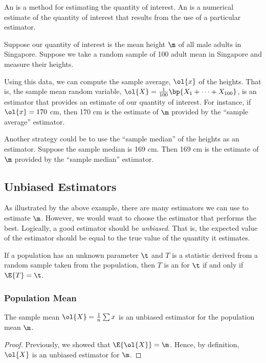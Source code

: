 \begin{definition}
    An  is a method for estimating the quantity of interest. An  is a numerical estimate of the quantity of interest that results from the use of a particular estimator.
\end{definition}

\begin{example}
    Suppose our quantity of interest is the mean height $\m$ of all male adults in Singapore. Suppose we take a random sample of 100 adult mean in Singapore and measure their heights.
    
    Using this data, we can compute the sample average, $\ol{x}$ of the heights. That is, the sample mean random variable, $\ol{X} = \frac1{100} \bp{X_1 + \dots + X_{100}}$, is an estimator that provides an estimate of our quantity of interest. For instance, if $\ol{x} = 170$ cm, then 170 cm is the estimate of $\m$ provided by the ``sample average'' estimator.

    Another strategy could be to use the ``sample median'' of the heights as an estimator. Suppose the sample median is 169 cm. Then 169 cm is the estimate of $\m$ provided by the ``sample median'' estimator.
\end{example}

\subsection{Unbiased Estimators}

As illustrated by the above example, there are many estimators we can use to estimate $\m$. However, we would want to choose the estimator that performs the best. Logically, a good estimator should be \emph{unbiased}. That is, the expected value of the estimator should be equal to the true value of the quantity it estimates. 

\begin{definition}
    If a population has an unknown parameter $\t$ and $T$ is a statistic derived from a random sample taken from the population, then $T$ is an  for $\t$ if and only if $\E{T} = \t$.
\end{definition}

\subsubsection{Population Mean}

\begin{proposition}
    The sample mean $\ol{X} = \frac1n \sum x$ is an unbiased estimator for the population mean $\m$.
\end{proposition}
\begin{proof}
    Previously, we showed that $\E{\ol{X}} = \m$. Hence, by definition, $\ol{X}$ is an unbiased estimator for $\m$.
\end{proof}

